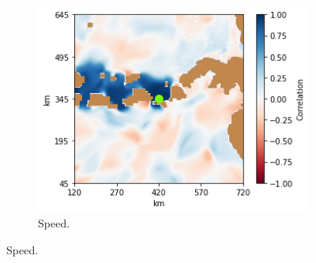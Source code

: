 \documentclass[11pt, english]{article}
\begin{document}
\begin{multicols}{2}
\begin{figure}
\begin{subfigure}{0.33\textwidth}
	\end{subfigure}
	\begin{subfigure}{0.33\textwidth}
		\centering
		\caption{Speed.}
		\label{fig:coord-1-s}
		\includegraphics[width=\textwidth]{coord-1-s}
	\end{subfigure}\vspace{2ex}
	

\end{figure}
\end{multicols}
\end{document}
